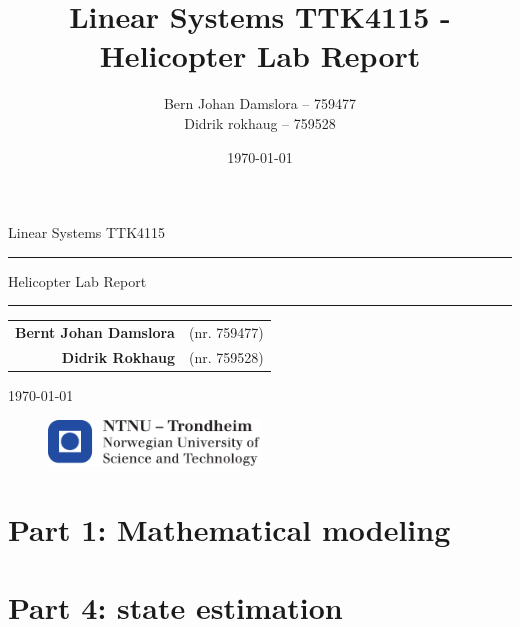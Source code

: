 \documentclass{article}
\title{Linear Systems TTK4115 - Helicopter Lab Report}
\author{Bern Johan Damslora -- 759477 \\ Didrik rokhaug -- 759528}
\date{\today}
\begin{document}
\begin{titlepage}
    \begin{center}
    	\large
    	Linear Systems TTK4115
    \end{center}
    \vspace{\fill}
    \rule{\linewidth}{0.5mm}
    \begin{center}
    	\huge
    	Helicopter Lab Report
    \end{center}
	\rule{\linewidth}{0.5mm}
	\vspace{\fill}

    \begin{table}[H]
    	\centering
    	\large
    	\begin{tabular}{rl}
    		\textbf{Bernt Johan Damslora} & (nr. 759477) \\
    		\textbf{Didrik Rokhaug} &  (nr. 759528)
    	
    	\end{tabular}
    \end{table}
    \vspace{\fill}
    \begin{center}
    	\large
    	\today
    \end{center}
	\vspace{\fill}
    \begin{figure}[H]
    \centering
    \includegraphics[width=0.5\textwidth]{images/logontnu_eng}
    \end{figure}
    \thispagestyle{empty}
\end{titlepage}

\tableofcontents
\thispagestyle{empty} %
\newpage    

\setcounter{page}{1}
\section{Part 1: Mathematical modeling}



\section{Part 4: state estimation}


\newpage

\end{document}
